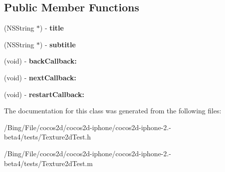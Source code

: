 \subsection*{Public Member Functions}
\begin{DoxyCompactItemize}
\item 
\hypertarget{interface_texture_demo_a4a568d9465d4e5895d0ce0dcdde5eba0}{(N\-S\-String $\ast$) -\/ {\bfseries title}}\label{interface_texture_demo_a4a568d9465d4e5895d0ce0dcdde5eba0}

\item 
\hypertarget{interface_texture_demo_a26bc59e09f43dbb43a812606413d6603}{(N\-S\-String $\ast$) -\/ {\bfseries subtitle}}\label{interface_texture_demo_a26bc59e09f43dbb43a812606413d6603}

\item 
\hypertarget{interface_texture_demo_a1655ebc38d7fb2cbbfcfc7e61cd16b68}{(void) -\/ {\bfseries back\-Callback\-:}}\label{interface_texture_demo_a1655ebc38d7fb2cbbfcfc7e61cd16b68}

\item 
\hypertarget{interface_texture_demo_a3631af025780ef032f36b47ed05c527b}{(void) -\/ {\bfseries next\-Callback\-:}}\label{interface_texture_demo_a3631af025780ef032f36b47ed05c527b}

\item 
\hypertarget{interface_texture_demo_ac523ca52db0df7cc3acc1cdad663aec1}{(void) -\/ {\bfseries restart\-Callback\-:}}\label{interface_texture_demo_ac523ca52db0df7cc3acc1cdad663aec1}

\end{DoxyCompactItemize}


The documentation for this class was generated from the following files\-:\begin{DoxyCompactItemize}
\item 
/\-Bing/\-File/cocos2d/cocos2d-\/iphone/cocos2d-\/iphone-\/2.-\/beta4/tests/Texture2d\-Test.\-h\item 
/\-Bing/\-File/cocos2d/cocos2d-\/iphone/cocos2d-\/iphone-\/2.-\/beta4/tests/Texture2d\-Test.\-m\end{DoxyCompactItemize}
